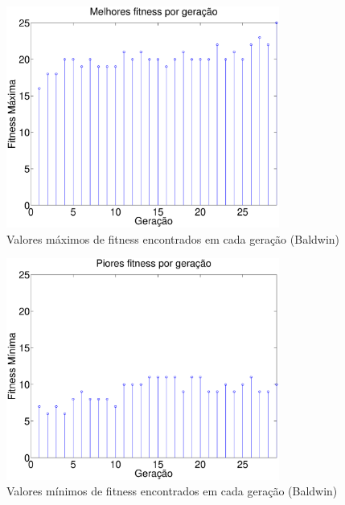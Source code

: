 \documentclass{report}
\begin{document}
\begin{figure}[H]
	\centering
	\includegraphics[width = 0.8\textwidth]{Q02_maximos_fitness_100_ger_baldwin.eps}
	\caption{Valores máximos de fitness encontrados em cada geração (Baldwin)}
	\label{Q02_maximos_fitness_100_ger_baldwin}
\end{figure}   

\begin{figure}[H]
	\centering
	\includegraphics[width = 0.8\textwidth]{Q02_minimos_fitness_100_ger_baldwin.eps}
	\caption{Valores mínimos de fitness encontrados em cada geração (Baldwin)}
	\label{Q02_minimos_fitness_100_ger_baldwin}
\end{figure}   
\end{document}
